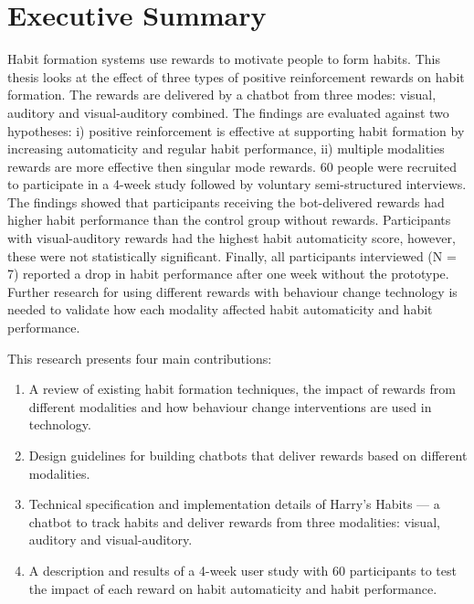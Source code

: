 
\section*{Executive Summary}
Habit formation systems use rewards to motivate people to form habits. This thesis looks at the effect of three types of positive reinforcement rewards on habit formation. The rewards are delivered by a chatbot from three modes: visual, auditory and visual-auditory combined. The findings are evaluated against two hypotheses: i) positive reinforcement is effective at supporting habit formation by increasing automaticity and regular habit performance, ii) multiple modalities rewards are more effective then singular mode rewards. 60 people were recruited to participate in a 4-week study followed by voluntary semi-structured interviews. The findings showed that participants receiving the bot-delivered rewards had higher habit performance than the control group without rewards. Participants with visual-auditory rewards had the highest habit automaticity score, however, these were not statistically significant. Finally, all participants interviewed (N = 7) reported a drop in habit performance after one week without the prototype. Further research for using different rewards with behaviour change technology is needed to validate how each modality affected habit automaticity and habit performance.

This research presents four main contributions:

\begin{enumerate}
  \item A review of existing habit formation techniques, the impact of rewards from different modalities and how behaviour change interventions are used in technology.
  \item Design guidelines for building chatbots that deliver rewards based on different modalities.
  \item Technical specification and implementation details of Harry's Habits --- a chatbot to track habits and deliver rewards from three modalities: visual, auditory and visual-auditory.
  \item A description and results of a 4-week user study with 60 participants to test the impact of each reward on habit automaticity and habit performance.
\end{enumerate}

\newpage



